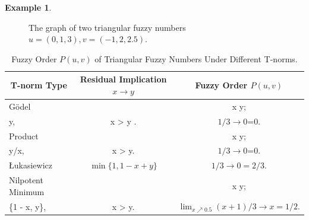 \documentclass[preprint,3p,times]{elsarticle}
\theoremstyle{plain}
\theoremstyle{definition}
\newtheorem{exmp}[thm]{Example}
\numberwithin{equation}{section}
\begin{document}
\begin{exmp}
\begin{figure}[htbp]
\begin{minipage}[t]{0.8\textwidth}
	\end{minipage}
	\caption{ The graph of two  triangular fuzzy numbers $u=(0,1,3),v=(-1,2,2.5)$.  }\label{fuzzy number u,v}
\end{figure}
\begin{table}[!htbp]
	\centering
	\caption{Fuzzy Order \(P(u, v)\) of Triangular Fuzzy Numbers Under Different T-norms.}
	\label{tab:fuzzy_order_tnorm}
	\begin{tabular}{lcc}
		\toprule
		\multicolumn{1}{c}{T-norm Type} & \multicolumn{1}{c}{Residual Implication \(x \to y\)} & \multicolumn{1}{c}{Fuzzy Order \(P(u, v)\)} \\
		\midrule
		Gödel & 
		\(\begin{cases} 
			1, & x \leq y; \\ 
			y, & x > y .
		\end{cases}\) & 
			\( 1/3 \rightarrow 0\)=0. \\
		\midrule
		Product & 
		\(\begin{cases} 
			1, & x \leq y; \\ 
			\displaystyle y/x, & x > y. 
		\end{cases}\) (\( \frac{0}{0}=1 \)) & 
		\( 1/3 \rightarrow 0\)=0. \\
		\midrule
		Łukasiewicz & 
		\(\min\{1, 1 - x + y\}\) & 
		\(\displaystyle 1/3 \rightarrow 0=2/3 \).\\
		\midrule
		Nilpotent Minimum & 
		\(\begin{cases} 
			1, & x \leq y; \\ 
			\max\{1 - x, y\}, & x > y. 
		\end{cases}\) & 
		\(\lim_{x\nearrow 0.5}  (x+1)/3 \rightarrow x  =1/2.\) \\
		\bottomrule
	\end{tabular}
\end{table}
\end{exmp}
\end{document}
